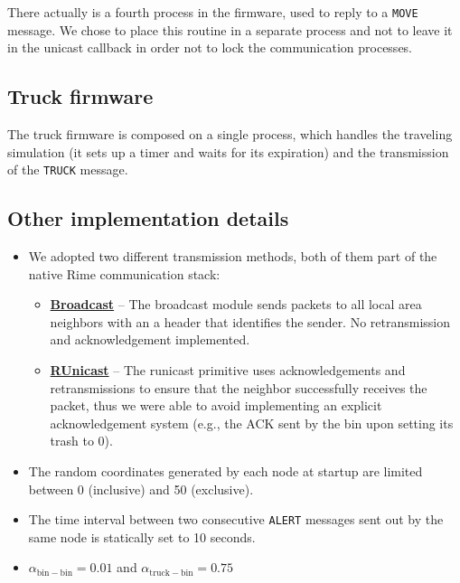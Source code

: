 \documentclass[a4paper, 11pt, parskip=half]{scrartcl}
\begin{document}
There actually is a fourth process in the firmware, used to reply to a \texttt{MOVE} message. We chose to place this routine in a separate process and not to leave it in the unicast callback in order not to lock the communication processes.

\subsection{Truck firmware}

The truck firmware is composed on a single process, which handles the traveling simulation (it sets up a timer and waits for its expiration) and the transmission of the \texttt{TRUCK} message.

\subsection{Other implementation details}

\begin{itemize}
	\item We adopted two different transmission methods, both of them part of the native Rime communication stack:
		\begin{itemize}
			\item \href{http://contiki.sourceforge.net/docs/2.6/a01720.html}{\textbf{Broadcast}} -- The broadcast module sends packets to all local area neighbors with an a header that identifies the sender. No retransmission and acknowledgement implemented.
			\item \href{http://contiki.sourceforge.net/docs/2.6/a01738.html}{\textbf{RUnicast}} -- The runicast primitive uses acknowledgements and retransmissions to ensure that the neighbor successfully receives the packet, thus we were able to avoid implementing an explicit acknowledgement system (e.g., the ACK sent by the bin upon setting its trash to 0).
		\end{itemize}
	\item The random coordinates generated by each node at startup are limited between 0 (inclusive) and 50 (exclusive).
	\item The time interval between two consecutive \texttt{ALERT} messages sent out by the same node is statically set to 10 seconds.
	\item $\alpha_\mathrm{bin-bin} = 0.01$ and $\alpha_\mathrm{truck-bin} = 0.75$
\end{itemize}
\end{document}
